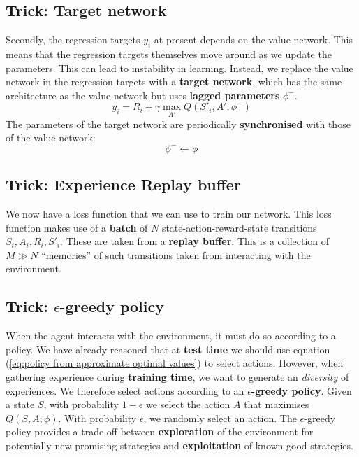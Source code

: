 \documentclass[]{article}
\begin{document}
\subsection*{Trick: Target network}
Secondly, the regression targets $y_i$ at present depends on the value network. This means that the regression targets themselves move around as we update the parameters. This can lead to instability in learning. Instead, we replace the value network in the regression targets with a \textbf{target network}, which has the same architecture as the value network but uses \textbf{lagged parameters} $\phi^-$. 
\begin{equation}\label{eq:regression targets final}
	y_i = R_i + \gamma \max_{A'} Q(S'_i,A';\phi^-)
\end{equation}
The parameters of the target network are periodically \textbf{synchronised} with those of the value network:
\begin{equation}\label{eq:synchronisation}
	\phi^- \gets \phi
\end{equation}

\subsection*{Trick: Experience Replay buffer}

We now have a loss function that we can use to train our network. This loss function makes use of a \textbf{batch} of $N$ state-action-reward-state transitions $S_i, A_i, R_i, S'_i$. These are taken from a \textbf{replay buffer}. This is a collection of $M \gg N$ ``memories'' of such transitions taken from interacting with the environment.  

\subsection*{Trick: $\epsilon$-greedy policy}

When the agent interacts with the environment, it must do so according to a policy. We have already reasoned that at \textbf{test time} we should use equation (\ref{eq:policy from approximate optimal values}) to select actions. However, when gathering experience during \textbf{training time}, we want to generate an \emph{diversity} of experiences. We therefore select actions according to an \textbf{$\epsilon$-greedy policy}. Given a state $S$, with probability $1 - \epsilon$ we select the action $A$ that maximises $Q(S,A;\phi)$. With probability $\epsilon$, we randomly select an action. The $\epsilon$-greedy policy provides a trade-off between \textbf{exploration} of the environment for potentially new promising strategies and \textbf{exploitation} of known good strategies. 
\end{document}
